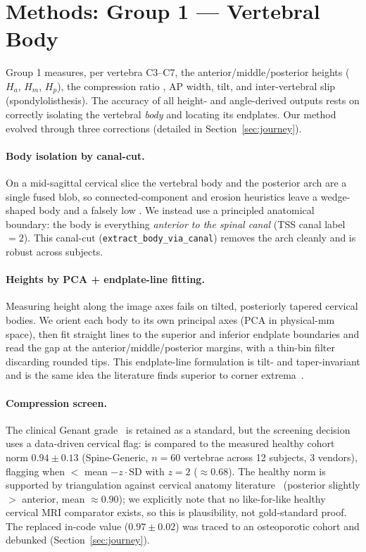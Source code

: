 \section{Methods: Group 1 --- Vertebral Body}
\label{sec:g1}

Group 1 measures, per vertebra C3--C7, the anterior/middle/posterior heights ($H_a$, $H_m$, $H_p$), the
compression ratio \hahp{}, AP width, tilt, and inter-vertebral slip (spondylolisthesis). The accuracy of
all height- and angle-derived outputs rests on correctly isolating the vertebral \emph{body} and locating
its endplates. Our method evolved through three corrections (detailed in Section~\ref{sec:journey}).

\paragraph{Body isolation by canal-cut.} On a mid-sagittal cervical slice the vertebral body and the
posterior arch are a single fused blob, so connected-component and erosion heuristics leave a wedge-shaped
body and a falsely low \hahp{}. We instead use a principled anatomical boundary: the body is everything
\emph{anterior to the spinal canal} (TSS canal label $=2$). This canal-cut (\texttt{extract\_body\_via\_canal})
removes the arch cleanly and is robust across subjects.

\paragraph{Heights by PCA + endplate-line fitting.} Measuring height along the image axes fails on tilted,
posteriorly tapered cervical bodies. We orient each body to its own principal axes (PCA in physical-mm
space), then fit straight lines to the superior and inferior endplate boundaries and read the gap at the
anterior/middle/posterior margins, with a thin-bin filter discarding rounded tips. This endplate-line
formulation is tilt- and taper-invariant and is the same idea the literature finds superior to corner
extrema~\cite{wang2023,chen2013}.

\paragraph{Compression screen.} The clinical Genant grade~\cite{genant1993} is retained as a standard,
but the screening decision uses a data-driven cervical flag: \hahp{} is compared to the measured healthy
cohort norm $0.94 \pm 0.13$ (Spine-Generic, $n=60$ vertebrae across 12 subjects, 3 vendors), flagging
when \hahp{} $<$ mean $- z\!\cdot\!\text{SD}$ with $z=2$ ($\approx 0.68$). The healthy norm is supported
by triangulation against cervical anatomy literature~\cite{tan2004,lee2012,kaur2025} (posterior slightly
$>$ anterior, mean $\approx 0.90$); we explicitly note that no like-for-like healthy cervical MRI \hahp{}
comparator exists, so this is plausibility, not gold-standard proof. The replaced in-code value
($0.97 \pm 0.02$) was traced to an osteoporotic cohort and debunked (Section~\ref{sec:journey}).

